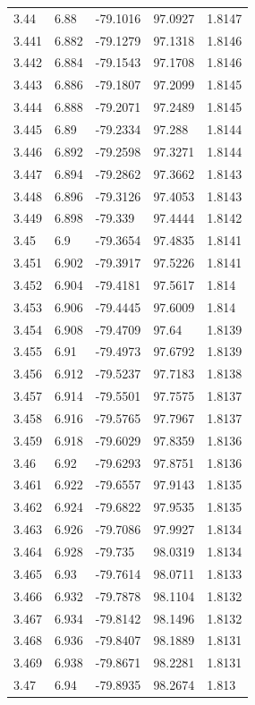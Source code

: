 \begin{tabular}{lllll}
3.44 & 6.88 & -79.1016 & 97.0927 & 1.8147 \\
3.441 & 6.882 & -79.1279 & 97.1318 & 1.8146 \\
3.442 & 6.884 & -79.1543 & 97.1708 & 1.8146 \\
3.443 & 6.886 & -79.1807 & 97.2099 & 1.8145 \\
3.444 & 6.888 & -79.2071 & 97.2489 & 1.8145 \\
3.445 & 6.89 & -79.2334 & 97.288 & 1.8144 \\
3.446 & 6.892 & -79.2598 & 97.3271 & 1.8144 \\
3.447 & 6.894 & -79.2862 & 97.3662 & 1.8143 \\
3.448 & 6.896 & -79.3126 & 97.4053 & 1.8143 \\
3.449 & 6.898 & -79.339 & 97.4444 & 1.8142 \\
3.45 & 6.9 & -79.3654 & 97.4835 & 1.8141 \\
3.451 & 6.902 & -79.3917 & 97.5226 & 1.8141 \\
3.452 & 6.904 & -79.4181 & 97.5617 & 1.814 \\
3.453 & 6.906 & -79.4445 & 97.6009 & 1.814 \\
3.454 & 6.908 & -79.4709 & 97.64 & 1.8139 \\
3.455 & 6.91 & -79.4973 & 97.6792 & 1.8139 \\
3.456 & 6.912 & -79.5237 & 97.7183 & 1.8138 \\
3.457 & 6.914 & -79.5501 & 97.7575 & 1.8137 \\
3.458 & 6.916 & -79.5765 & 97.7967 & 1.8137 \\
3.459 & 6.918 & -79.6029 & 97.8359 & 1.8136 \\
3.46 & 6.92 & -79.6293 & 97.8751 & 1.8136 \\
3.461 & 6.922 & -79.6557 & 97.9143 & 1.8135 \\
3.462 & 6.924 & -79.6822 & 97.9535 & 1.8135 \\
3.463 & 6.926 & -79.7086 & 97.9927 & 1.8134 \\
3.464 & 6.928 & -79.735 & 98.0319 & 1.8134 \\
3.465 & 6.93 & -79.7614 & 98.0711 & 1.8133 \\
3.466 & 6.932 & -79.7878 & 98.1104 & 1.8132 \\
3.467 & 6.934 & -79.8142 & 98.1496 & 1.8132 \\
3.468 & 6.936 & -79.8407 & 98.1889 & 1.8131 \\
3.469 & 6.938 & -79.8671 & 98.2281 & 1.8131 \\
3.47 & 6.94 & -79.8935 & 98.2674 & 1.813 \\

\end{tabular}
